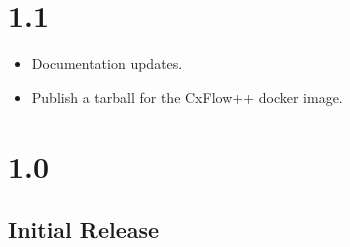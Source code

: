 
\section{1.1}

\begin{itemize}
    \item Documentation updates.
    \item Publish a tarball for the CxFlow++ docker image.
\end{itemize}

\section{1.0}

\subsection*{Initial Release}
